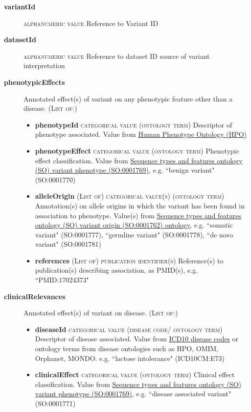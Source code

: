 \documentclass[a4paper, 10pt]{article}        %
\begin{document}
  \begin{description}
  	\item[\textbf{variantId}] {\textsc{alphanumeric value}} Reference to Variant ID 		\item[\textbf{datasetId}] {\textsc{alphanumeric value}} Reference to dataset ID source of variant interpretation
	\item[\textbf{phenotypicEffects}] Annotated effect(s) of variant on any phenotypic feature other than a disease. {\textsc{(List of:)}}
	\begin{itemize}
				\item[] \textbf{phenotypeId} {\textsc{categorical value (ontology term)}} Descriptor of phenotype associated. Value from \href{http:purl.obolibrary.org/obo/HP_0000001}{Human Phenotype Ontology (HPO)}
				\item[] \textbf{phenotypeEffect} {\textsc{categorical value (ontology term)}} Phenotypic effect classification. Value from \href{http://purl/obolibrary.org/obo/SO_0001769}{Sequence types and features ontology (SO) variant phenotype (SO:0001769)}, e.g. ``benign variant" (SO:0001770)
				\item[] \textbf{alleleOrigin} {\textsc{(List of) categorical value(s) (ontology term)}} Annotation(s) on allele origins in which the variant has been found in association to phenotype. Value(s) from \href{http://purl.obolibrary.org/obo/SO_0001762}{Sequence types and features ontology (SO) variant origin (SO:0001762) ontology}, e.g. ``somatic variant" (SO:0001777), ``germline variant" (SO:0001778), ``de novo variant" (SO:0001781)
				\item[] \textbf{references} {\textsc{(List of) publication identifier(s)}} Reference(s) to publication(s) describing association, as PMID(s), e.g. ``PMID:17024373"
	\end{itemize} 
	\item[\textbf{clinicalRelevances}] Annotated effect(s) of variant on disease. {\textsc{(List of:)}}
			\begin{itemize}
				\item[] \textbf{diseaseId} {\textsc{categorical value (disease code/ ontology term)}} Descriptor of disease associated. Value from \href{https://www.who.int/classifications/icd/en/}{ICD10 disease codes} or ontology terms from disease ontologies such as HPO, OMIM, Orphanet, MONDO. e.g. ``lactose intolerance" (ICD10CM:E73)
				\item[] \textbf{clinicalEffect} {\textsc{categorical value (ontology term)}} Clinical effect classification. Value from \href{http://purl/obolibrary.org/obo/SO_0001769}{Sequence types and features ontology (SO) variant phenotype (SO:0001769)}, e.g. ``disease associated variant" (SO:0001771)

\end{itemize}
\end{description}
\end{document}
